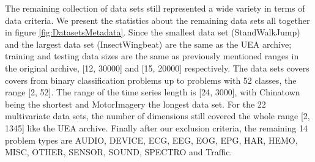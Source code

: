 The remaining collection of data sets still represented a wide variety in terms of data criteria.
We present the statistics about the remaining data sets all together in figure \ref{fig:DatasetsMetadata}.
Since the smallest data set (StandWalkJump) and the largest data set (InsectWingbeat) are the same as the UEA archive; training and testing data sizes are the same as previously mentioned ranges in the original archive, [12, 30000] and [15, 20000] respectively.
The data sets covers covers from binary classification problems up to problems with 52 classes, the range [2, 52].
The range of the time series length is [24, 3000], with Chinatown being the shortest and MotorImagery the longest data set.
For the 22 multivariate data sets, the number of dimensions still covered the whole range [2, 1345] like the UEA archive.
Finally after our exclusion criteria, the remaining 14 problem types are AUDIO, DEVICE, ECG, EEG, EOG, EPG, HAR, HEMO, MISC, OTHER, SENSOR, SOUND, SPECTRO and Traffic.

